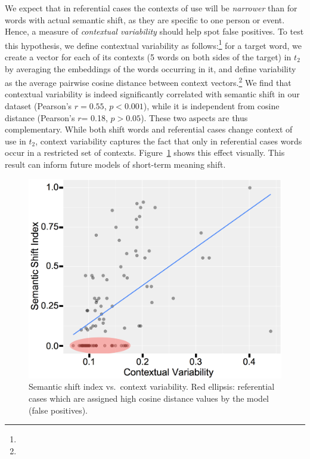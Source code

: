 We expect that in referential cases the contexts of use will 
be \textit{narrower} than for words with actual
semantic shift, as they are specific to one person or
event. Hence, a measure of \textit{contextual variability}
should help spot false positives.  To test this hypothesis, we define
contextual variability as follows:\footnote{} for a target word, we create a
vector for each of its contexts (5 words on both sides of the target) in $t_2$ by averaging the embeddings of
the words occurring in it, and define variability as the average
pairwise cosine distance between context vectors.\footnote{} 
We find that
contextual variability is indeed significantly correlated with
semantic shift in our dataset (Pearson's $r\!=\!0.55$, $p\!<\!0.001$),
while it is independent from cosine distance (Pearson's $r$= 0.18,
$p> 0.05$). These two aspects are thus complementary. While both shift
words and referential cases change context of use in $t_2$, context
variability captures the fact that only in referential cases words
occur in a restricted set of contexts. 
Figure~\ref{fig:shift-variability} shows this effect visually.  This
result can inform future 
models of short-term meaning
shift.

\begin{figure}[h!]\centering
\includegraphics[width=\columnwidth]{images/contextual_variability_shift_index_annotated_4.png}
\caption{Semantic shift index vs.~context variability. Red ellipsis: referential cases which are assigned high cosine distance values by the model (false positives).\label{fig:shift-variability}}
\end{figure}


